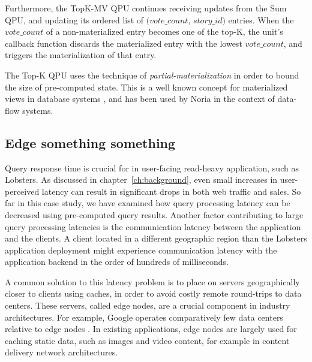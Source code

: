 Furthermore, the TopK-MV QPU continues receiving updates from the Sum QPU, and updating its
ordered list of $(vote\_count$, $story\_id)$ entries.
When the $vote\_count$ of a non-materialized entry becomes one of the top-K,
the unit's callback function discards the materialized entry with the lowest $vote\_count$,
and triggers the materialization of that entry.

The Top-K QPU uses the technique of \textit{partial-materialization} in order to bound the size of pre-computed state.
This is a well known concept for materialized views in database systems \cite{zhou:partiallymaterialized, zhou:dynamicmaterialized},
and has been used by Noria \cite{gjengset:noria} in the context of data-flow systems.

\subsection{Edge something something}


Query response time is crucial for in user-facing read-heavy application, such as Lobsters.
As discussed in chapter~\ref{ch:background}, even small increases in user-perceived latency can result in significant drops in both web traffic and sales.
So far in this case study, we have examined how query processing latency can be decreased using pre-computed query results.
Another factor contributing to large query processing latencies is the communication latency between the application and the clients.
A client located in a different geographic region than the Lobsters application deployment might experience communication
latency with the application backend in the order of hundreds of milliseconds.

A common solution to this latency problem is to place on servers geographically closer to clients using caches,
in order to avoid costly remote round-trips to data centers.
These servers, called edge nodes, are a crucial component in industry architectures.
For example, Google operates comparatively few data centers relative to edge nodes \cite{google:infra}.
In existing applications,
edge nodes are largely used for caching static data, such as images and video content, for example in content delivery network architectures.

